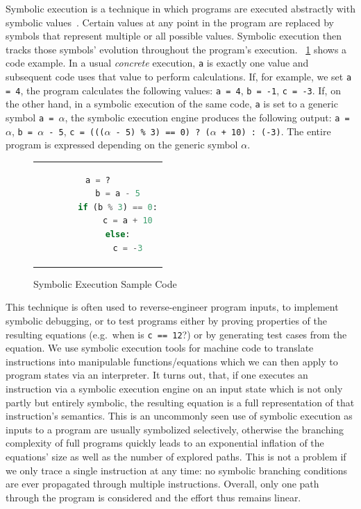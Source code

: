 Symbolic execution is a technique in which programs are executed abstractly with symbolic values~\cite{Steinhöfel2022}.
Certain values at any point in the program are replaced by symbols that represent multiple or all possible values.
Symbolic execution then tracks those symbols' evolution throughout the program's execution.
\lstlistingname~\ref{fig:symbexec_example_listing} shows a code example. In a usual \textit{concrete} execution,
\texttt{a} is exactly one value and subsequent code uses that value to perform calculations. If, for example, we set
\texttt{a = 4}, the program calculates the following values: \texttt{a = 4}, \texttt{b = -1}, \texttt{c = -3}. If, on
the other hand, in a symbolic execution of the same code, \texttt{a} is set to a generic symbol \texttt{a = $\alpha$},
the symbolic execution engine produces the following output: \texttt{a = $\alpha$}, \texttt{b = $\alpha$ - 5}, \texttt{c
= ((($\alpha$ - 5) \% 3) == 0) ? ($\alpha$ + 10) : (-3)}. The entire program is expressed depending on the generic
symbol $\alpha$.

\begin{figure}[htbp]
    \centering
    \begin{tabular}{c}
    \begin{lstlisting}[language=Python]
        a = ?
        b = a - 5
        if (b % 3) == 0:
            c = a + 10
        else:
            c = -3
    \end{lstlisting}
    \end{tabular}
    \caption[Symbolic execution example]{Symbolic Execution Sample Code}\label{fig:symbexec_example_listing}
\end{figure}


This technique is often used to reverse-engineer program inputs, to implement symbolic debugging, or to test programs
either by proving properties of the resulting equations (e.g.\ when is \texttt{c == 12}?) or by generating test cases
from the equation. We use symbolic execution tools for machine code to translate instructions into manipulable
functions/equations which we can then apply to program states via an interpreter. It turns out, that, if one executes an
instruction via a symbolic execution engine on an input state which is not only partly but entirely symbolic, the
resulting equation is a full representation of that instruction's semantics. This is an uncommonly seen use of symbolic
execution as inputs to a program are usually symbolized selectively, otherwise the branching complexity of full programs
quickly leads to an exponential inflation of the equations' size as well as the number of explored paths. This is not a
problem if we only trace a single instruction at any time: no symbolic branching conditions are ever propagated through
multiple instructions. Overall, only one path through the program is considered and the effort thus remains linear.

